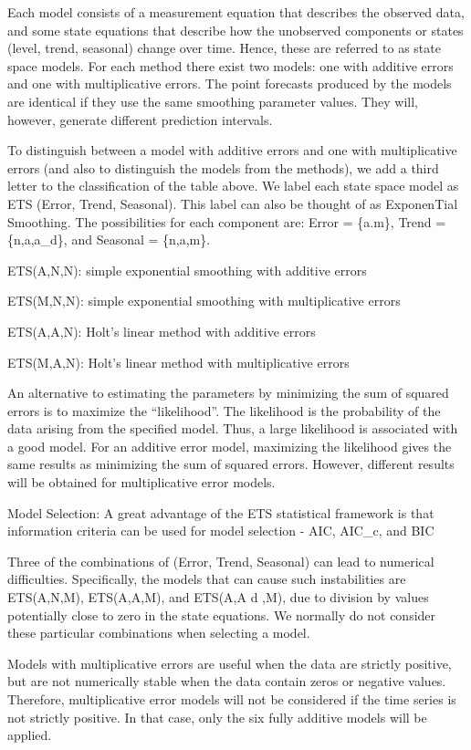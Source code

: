 \documentclass[]{book}
\begin{document}
Each model consists of a measurement equation that describes the
observed data, and some state equations that describe how the unobserved
components or states (level, trend, seasonal) change over time. Hence,
these are referred to as state space models. For each method there exist
two models: one with additive errors and one with multiplicative errors.
The point forecasts produced by the models are identical if they use the
same smoothing parameter values. They will, however, generate different
prediction intervals.

To distinguish between a model with additive errors and one with
multiplicative errors (and also to distinguish the models from the
methods), we add a third letter to the classification of the table
above. We label each state space model as ETS (Error, Trend, Seasonal).
This label can also be thought of as ExponenTial Smoothing. The
possibilities for each component are: Error = \{a.m\}, Trend =
\{n,a,a\_d\}, and Seasonal = \{n,a,m\}.

ETS(A,N,N): simple exponential smoothing with additive errors

ETS(M,N,N): simple exponential smoothing with multiplicative errors

ETS(A,A,N): Holt's linear method with additive errors

ETS(M,A,N): Holt's linear method with multiplicative errors

An alternative to estimating the parameters by minimizing the sum of
squared errors is to maximize the ``likelihood''. The likelihood is the
probability of the data arising from the specified model. Thus, a large
likelihood is associated with a good model. For an additive error model,
maximizing the likelihood gives the same results as minimizing the sum
of squared errors. However, different results will be obtained for
multiplicative error models.

Model Selection: A great advantage of the ETS statistical framework is
that information criteria can be used for model selection - AIC, AIC\_c,
and BIC

Three of the combinations of (Error, Trend, Seasonal) can lead to
numerical difficulties. Specifically, the models that can cause such
instabilities are ETS(A,N,M), ETS(A,A,M), and ETS(A,A d ,M), due to
division by values potentially close to zero in the state equations. We
normally do not consider these particular combinations when selecting a
model.

Models with multiplicative errors are useful when the data are strictly
positive, but are not numerically stable when the data contain zeros or
negative values. Therefore, multiplicative error models will not be
considered if the time series is not strictly positive. In that case,
only the six fully additive models will be applied.
\end{document}
